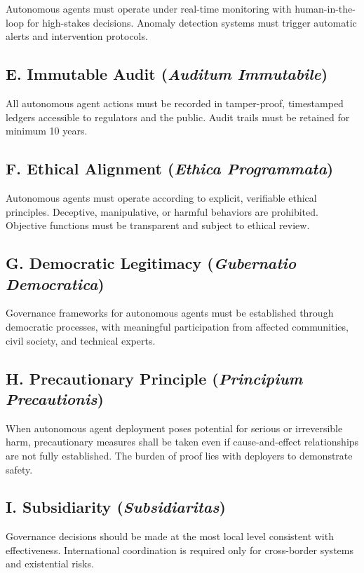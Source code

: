 Autonomous agents must operate under real-time monitoring with human-in-the-loop for high-stakes decisions. Anomaly detection systems must trigger automatic alerts and intervention protocols.

\subsection*{E. Immutable Audit (\textit{Auditum Immutabile})}

All autonomous agent actions must be recorded in tamper-proof, timestamped ledgers accessible to regulators and the public. Audit trails must be retained for minimum 10 years.

\subsection*{F. Ethical Alignment (\textit{Ethica Programmata})}

Autonomous agents must operate according to explicit, verifiable ethical principles. Deceptive, manipulative, or harmful behaviors are prohibited. Objective functions must be transparent and subject to ethical review.

\subsection*{G. Democratic Legitimacy (\textit{Gubernatio Democratica})}

Governance frameworks for autonomous agents must be established through democratic processes, with meaningful participation from affected communities, civil society, and technical experts.

\subsection*{H. Precautionary Principle (\textit{Principium Precautionis})}

When autonomous agent deployment poses potential for serious or irreversible harm, precautionary measures shall be taken even if cause-and-effect relationships are not fully established. The burden of proof lies with deployers to demonstrate safety.

\subsection*{I. Subsidiarity (\textit{Subsidiaritas})}

Governance decisions should be made at the most local level consistent with effectiveness. International coordination is required only for cross-border systems and existential risks.

